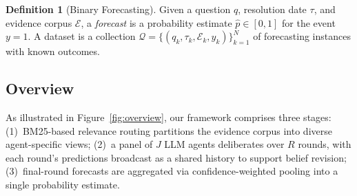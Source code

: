 \documentclass[11pt]{article}
\theoremstyle{definition}          %
\newtheorem{definition}{Definition}[section]
\begin{document}
\begin{definition}[Binary Forecasting]
Given a question $q$, resolution date $\tau$, and evidence corpus $\mathcal{E}$,
a \emph{forecast} is a probability estimate $\hat{p} \in [0,1]$ for the event $y=1$.
A dataset is a collection $\mathcal{Q} = \{(q_k, \tau_k, \mathcal{E}_k, y_k)\}_{k=1}^{N}$
of forecasting instances with known outcomes.
\end{definition}


\subsection{Overview}






As illustrated in Figure~\ref{fig:overview}, our framework comprises three stages:
(1)~BM25-based relevance routing partitions the evidence corpus into diverse agent-specific views;
(2)~a panel of $J$ LLM agents deliberates over $R$ rounds, with each round's predictions
broadcast as a shared history to support belief revision;
(3)~final-round forecasts are aggregated via confidence-weighted pooling into a single
probability estimate.
\end{document}
